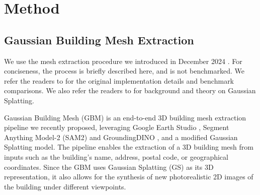 \section{Method} \label{sec:methodology}
\subsection{Gaussian Building Mesh Extraction}
We use the mesh extraction procedure we introduced in December 2024 \cite{gbm}. For conciseness, the process is briefly described here, and is not benchmarked. We refer the readers to \cite{gbm} for the original implementation details and benchmark comparisons. We also refer the readers to \cite{2023gaussian_splatting} for background and theory on Gaussian Splatting.

Gaussian Building Mesh (GBM) \cite{gbm} is an end-to-end 3D building mesh extraction pipeline we recently proposed, leveraging Google Earth Studio \cite{google_earth_studio}, Segment Anything Model-2 (SAM2)\cite{SAM2} and GroundingDINO \cite{groundingdino}, and a modified \cite{2dgsp} Gaussian Splatting \cite{2023gaussian_splatting} model. The pipeline enables the extraction of a 3D building mesh from inputs such as the building's name, address, postal code, or geographical coordinates. Since the GBM uses Gaussian Splatting (GS) as its 3D representation, it also allows for the synthesis of new photorealistic 2D images of the building under different viewpoints. 


